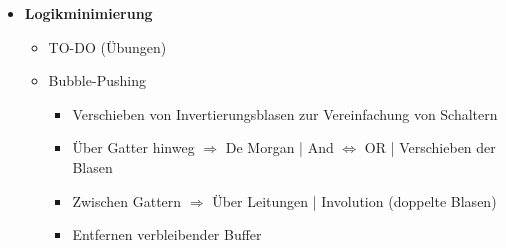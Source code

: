 \documentclass[11pt,a4paper]{article}
\begin{document}
\begin{itemize}
\item \textbf{Logikminimierung}
	\begin{itemize}
	\item TO-DO (Übungen)
	
	\item Bubble-Pushing
		\begin{itemize}
		
		\item Verschieben von Invertierungsblasen zur Vereinfachung von Schaltern
		\item Über Gatter hinweg $\Rightarrow$ De Morgan | And $\Leftrightarrow$ OR | Verschieben der Blasen
		\item Zwischen Gattern $\Rightarrow$ Über Leitungen | Involution (doppelte Blasen) 
		\item Entfernen verbleibender Buffer
		
		\end{itemize}
	\end{itemize}
	
\end{itemize}
\end{document}
